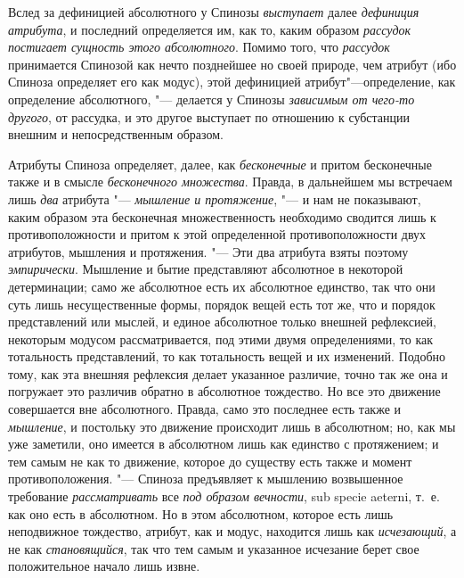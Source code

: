 Вслед за дефиницией абсолютного у Спинозы
{\em выступает} далее
{\em дефиниция атрибута}, и последний определяется им,
как то, каким образом {\em рассудок постигает сущность
этого
абсолютного}.
Помимо того, что {\em рассудок} принимается Спинозой
как нечто позднейшее но своей природе, чем атрибут (ибо Спиноза определяет
его как модус), этой дефиницией атрибут"---определение, как определение
абсолютного, "--- делается у Спинозы {\em зависимым от
чего-то другого}, от рассудка, и это другое выступает по отношению к
субстанции внешним и непосредственным образом.

Атрибуты Спиноза определяет, далее, как
{\em бесконечные} и притом бесконечные также и в смысле
{\em бесконечного множества}. Правда, в дальнейшем мы
встречаем лишь {\em два} атрибута
"--- {\em мышление и протяжение}, "--- и нам не показывают,
каким образом эта бесконечная множественность необходимо сводится лишь к
противоположности и притом к этой определенной противоположности двух
атрибутов, мышления и протяжения. "--- Эти два атрибута взяты поэтому
{\em эмпирически}. Мышление и бытие представляют
абсолютное в некоторой детерминации; само же абсолютное есть их абсолютное
единство, так что они суть лишь несущественные формы, порядок вещей есть
тот же, что и порядок представлений или мыслей, и единое абсолютное только
внешней рефлексией, некоторым модусом рассматривается, под этими двумя
определениями, то как тотальность представлений, то как тотальность вещей и
их изменений. Подобно тому, как эта внешняя рефлексия делает указанное
различие, точно так же она и погружает это различив обратно в абсолютное
тождество. Но все это движение совершается вне абсолютного. Правда, само
это последнее есть также и {\em мышление}, и постольку
это движение происходит лишь в абсолютном; но, как мы уже заметили, оно
имеется в абсолютном лишь как единство с протяжением; и тем самым не как то
движение, которое до существу есть также и момент противоположения. "---
Спиноза предъявляет к мышлению возвышенное требование
{\em рассматривать} все {\em под
образом вечности}, sub specie aeterni, т.~е. как оно есть в абсолютном. Но
в этом абсолютном, которое есть лишь неподвижное тождество, атрибут, как и
модус, находится лишь как {\em исчезающий}, а не как
{\em становящийся}, так что тем самым и указанное
исчезание берет свое положительное начало лишь извне.

